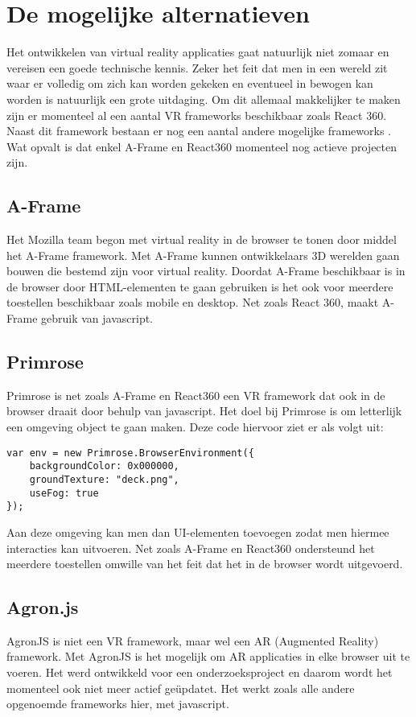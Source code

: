 \section{De mogelijke alternatieven}
\label{sec:frameworks-alternatieven}
Het ontwikkelen van virtual reality applicaties gaat natuurlijk niet zomaar en vereisen een goede technische kennis. Zeker het feit dat men in een wereld zit waar er volledig om zich kan worden gekeken en eventueel in bewogen kan worden is natuurlijk een grote uitdaging. Om dit allemaal makkelijker te maken zijn er momenteel al een aantal VR frameworks beschikbaar zoals React 360. Naast dit framework bestaan er nog een aantal andere mogelijke frameworks \autocite{UIUXLab2017}. Wat opvalt is dat enkel A-Frame en React360 momenteel nog actieve projecten zijn. 

\subsection{A-Frame}
\label{subsec:a-frame}
Het Mozilla team begon met virtual reality in de browser te tonen door middel het A-Frame framework. Met A-Frame kunnen ontwikkelaars 3D werelden gaan bouwen die bestemd zijn voor virtual reality. Doordat A-Frame beschikbaar is in de browser door HTML-elementen te gaan gebruiken is het ook voor meerdere toestellen beschikbaar zoals mobile en desktop. Net zoals React 360, maakt A-Frame gebruik van javascript.
 
\subsection{Primrose}
\label{subsec:primrose}
Primrose is net zoals A-Frame en React360 een VR framework dat ook in de browser draait door behulp van javascript. Het doel bij Primrose is om letterlijk een omgeving object te gaan maken. Deze code hiervoor ziet er als volgt uit:

\begin{lstlisting}[frame=single, caption=Voorbeeld van Primrose omgeving]
var env = new Primrose.BrowserEnvironment({
	backgroundColor: 0x000000,
	groundTexture: "deck.png",
	useFog: true
});
\end{lstlisting}

Aan deze omgeving kan men dan UI-elementen toevoegen zodat men hiermee interacties kan uitvoeren. Net zoals A-Frame en React360 ondersteund het meerdere toestellen omwille van het feit dat het in de browser wordt uitgevoerd.

\subsection{Agron.js}
\label{subsec:agron.js}
AgronJS is niet een VR framework, maar wel een AR (Augmented Reality) framework. Met AgronJS is het mogelijk om AR applicaties in elke browser uit te voeren. Het werd ontwikkeld voor een onderzoeksproject en daarom wordt het momenteel ook niet meer actief geüpdatet. Het werkt zoals alle andere opgenoemde frameworks hier, met javascript.



